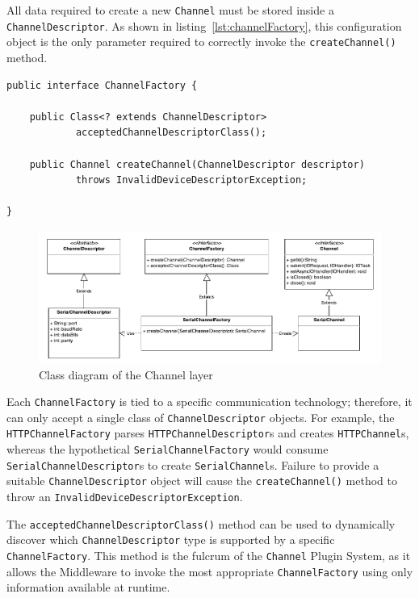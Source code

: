 All data required to create a new \texttt{Channel} must be stored inside a \texttt{ChannelDescriptor}. As shown in listing~\ref{lst:channelFactory}, this configuration object is the only parameter required to correctly invoke the \texttt{createChannel()} method.

\lstset{language=Java}
\begin{lstlisting}[float,caption=The ChannelFactory interface,label={lst:channelFactory}]
public interface ChannelFactory {

	public Class<? extends ChannelDescriptor>
			acceptedChannelDescriptorClass();

	public Channel createChannel(ChannelDescriptor descriptor)
			throws InvalidDeviceDescriptorException;

}
\end{lstlisting}

\begin{figure}[h!]
\includegraphics[width=\textwidth]{imgs/channel_factory.pdf}
\caption{Class diagram of the Channel layer}
\end{figure}

Each \texttt{ChannelFactory} is tied to a specific communication technology; therefore, it can only accept a single class of \texttt{ChannelDescriptor} objects. For example, the \texttt{HTTPChannelFactory} parses \texttt{HTTPChannelDescriptor}s and creates \texttt{HTTPChannel}s, whereas the hypothetical \texttt{SerialChannelFactory} would consume \texttt{SerialChannelDescriptor}s to create \texttt{SerialChannel}s. Failure to provide a suitable \texttt{ChannelDescriptor} object will cause the \texttt{createChannel()} method to throw an \texttt{InvalidDeviceDescriptorException}.

The \texttt{acceptedChannelDescriptorClass()} method can be used to dynamically discover which \texttt{ChannelDescriptor} type is supported by a specific \texttt{ChannelFactory}. This method is the fulcrum of the \texttt{Channel} Plugin System, as it allows the Middleware to invoke the most appropriate \texttt{ChannelFactory} using only information available at runtime.

